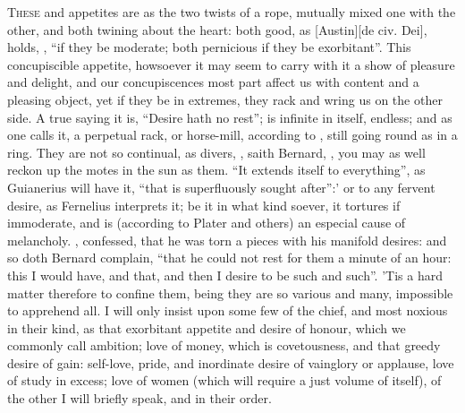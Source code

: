 \lettrine{T}{hese}  and
 appetites are as the two twists of a rope,
mutually mixed one with the other, and both twining about the heart: both good,
as [Austin][\textlatin{de civ. Dei}], holds, ,
\enquote{if they be moderate; both pernicious if they be
exorbitant}. This concupiscible appetite, howsoever it may seem to carry with
it a show of pleasure and delight, and our concupiscences most part affect us
with content and a pleasing object, yet if they be in extremes, they rack and
wring us on the other side. A true saying it is, \enquote{Desire hath no rest}; is
infinite in itself, endless; and as one calls it, a
perpetual rack, or horse-mill, according to \Austin{}, still
going round as in a ring. They are not so continual, as divers, , saith Bernard, , you may as well reckon up the motes in
the sun as them. \enquote{It extends itself to everything}, as
Guianerius will have it, \enquote{that is superfluously sought after}:' or to any
fervent desire, as Fernelius interprets it; be it in what
kind soever, it tortures if immoderate, and is (according to
Plater and others) an especial cause of melancholy.
,
\Austin{} confessed, that he was torn a pieces with his
manifold desires: and so doth Bernard complain, \enquote{that he
could not rest for them a minute of an hour: this I would have, and that, and
then I desire to be such and such}. 'Tis a hard matter therefore to confine
them, being they are so various and many, impossible to apprehend all. I will
only insist upon some few of the chief, and most noxious in their kind, as that
exorbitant appetite and desire of honour, which we commonly call ambition; love
of money, which is covetousness, and that greedy desire of gain: self-love,
pride, and inordinate desire of vainglory or applause, love of study in excess;
love of women (which will require a just volume of itself), of the other I will
briefly speak, and in their order.

